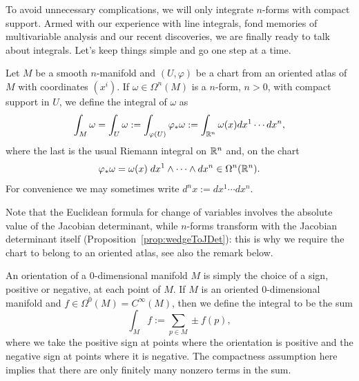 To avoid unnecessary complications, we will only integrate $n$-forms with compact support.
Armed with our experience with line integrals, fond memories of multivariable analysis and our recent discoveries, we are finally ready to talk about integrals.
Let's keep things simple and go one step at a time.

\begin{definition}\label{def:intnform:chart}
	Let $M$ be a smooth $n$-manifold and $(U,\varphi)$ be a chart from an oriented atlas of $M$ with coordinates $(x^i)$.
	If $\omega\in\Omega^n(M)$ is a $n$-form, $n > 0$, with compact support in $U$, we define the integral of $\omega$ as
	\begin{equation}
		\int_M \omega = \int_U \omega := \int_{\varphi(U)} \varphi_*\omega := \int_{\mathbb{R}^n} \omega(x) d x^1\cdots dx^n,
	\end{equation}
	where the last is the usual Riemann integral on $\mathbb{R}^n$ and, on the chart
	\begin{equation}
		\varphi_*\omega = \omega(x)\; dx^{1}\wedge \cdots\wedge dx^{n}\in\Omega^n(\mathbb{R}^n).
	\end{equation}
	For convenience we may sometimes write $d^n x := dx^1 \cdots dx^n$.

	Note that the Euclidean formula for change of variables involves the absolute value of the Jacobian determinant, while $n$-forms transform with the Jacobian determinant itself (Proposition~\ref{prop:wedgeToJDet}): this is why we require the chart to belong to an oriented atlas, see also the remark below.


	An orientation of a $0$-dimensional manifold $M$ is simply the choice of a sign, positive or negative, at each point of $M$.
	If $M$ is an oriented $0$-dimensional manifold and $f\in\Omega^0(M) = C^\infty(M)$, then we define the integral to be the sum
	\begin{equation}
		\int_M f := \sum_{p\in M} \pm f(p),
	\end{equation}
	where we take the positive sign at points where the orientation is positive and the negative sign at points where it is negative.
	The compactness assumption here implies that there are only finitely many nonzero terms in the sum.
\end{definition}

